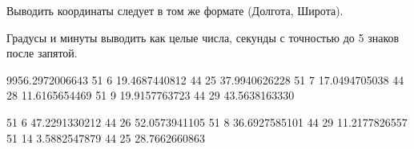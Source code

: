 Выводить координаты следует в том же формате (Долгота, Широта).

Градусы и минуты выводить как целые числа, секунды с точностью до 5 знаков после запятой.

\begin{myverbbox}[\small]{\vinput}
    9956.2972006643
    51 6 19.4687440812 44 25 37.9940626228
    51 7 17.0494705038 44 28 11.6165654469
    51 9 19.9157763723 44 29 43.5638163330
\end{myverbbox}
\begin{myverbbox}[\small]{\voutput}
    51 6 47.2291330212 44 26 52.0573941105
    51 8 36.6927585101 44 29 11.2177826557
    51 14 3.5882547879 44 25 28.7662660863
\end{myverbbox}


